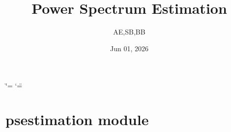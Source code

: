 \documentclass[a4paper,11pt,oneside,english,openany]{sphinxmanual}
\title{Power Spectrum Estimation}
\date{Jun 01, 2026}
\author{AE,SB,BB}
\begin{document}
\ifdefined\shorthandoff
  \ifnum\catcode`\=\string=\active\shorthandoff{=}\fi
  \ifnum\catcode`\"=\active{}\fi
\fi

\pagestyle{empty}
\sphinxmaketitle
\pagestyle{plain}
\sphinxtableofcontents
\pagestyle{normal}
\label{\detokenize{index::doc}}
\sphinxstepscope



\sphinxstepscope


\chapter{psestimation module}
\label{\detokenize{psestimation:module-psestimation}}\label{\detokenize{psestimation:psestimation-module}}\label{\detokenize{psestimation::doc}}
\end{document}
